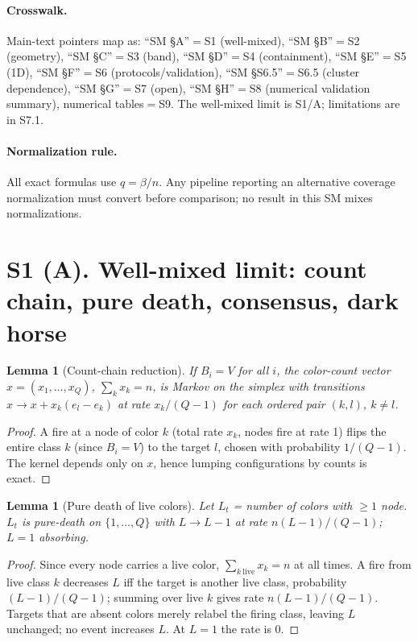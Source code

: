 \documentclass[preprint,12pt]{elsarticle}
\newtheorem{lemma}[theorem]{Lemma}
\begin{document}
\paragraph{Crosswalk.}
Main-text pointers map as: ``SM \S A''$=$S1 (well-mixed),
``SM \S B''$=$S2 (geometry), ``SM \S C''$=$S3 (band), ``SM \S D''$=$S4
(containment), ``SM \S E''$=$S5 (1D), ``SM \S F''$=$S6
(protocols/validation), ``SM \S S6.5''$=$S6.5 (cluster dependence),
``SM \S G''$=$S7 (open), ``SM \S H''$=$S8 (numerical validation summary),
numerical tables$=$S9. The well-mixed limit is S1/A; limitations are in S7.1.

\paragraph{Normalization rule.}
All exact formulas use $q=\beta/n$. Any pipeline reporting an alternative
coverage normalization must convert before comparison; no result in this
SM mixes normalizations.

\section{S1 (A). Well-mixed limit: count chain, pure death, consensus, dark horse}
\label{sec:A}

\begin{lemma}[Count-chain reduction]
\label{lem:A1}
If $B_i=V$ for all $i$, the color-count vector $x=(x_1,\dots,x_Q)$,
$\sum_k x_k=n$, is Markov on the simplex with transitions
$x\to x+x_k(e_l-e_k)$ at rate $x_k/(Q-1)$ for each ordered pair
$(k,l)$, $k\neq l$.
\end{lemma}
\begin{proof}
A fire at a node of color $k$ (total rate $x_k$, nodes fire at rate 1)
flips the entire class $k$ (since $B_i=V$) to the target $l$, chosen with
probability $1/(Q-1)$. The kernel depends only on $x$, hence lumping
configurations by counts is exact.
\end{proof}

\begin{lemma}[Pure death of live colors]
\label{lem:A2}
Let $L_t$ = number of colors with $\ge1$ node. $L_t$ is pure-death on
$\{1,\dots,Q\}$ with $L\to L-1$ at rate $n(L-1)/(Q-1)$; $L=1$ absorbing.
\end{lemma}
\begin{proof}
Since every node carries a live color,
$\sum_{k\ \mathrm{live}}x_k=n$ at all times. A fire from live class $k$
decreases $L$ iff the target is another live class, probability
$(L-1)/(Q-1)$; summing over live $k$ gives rate $n(L-1)/(Q-1)$. Targets
that are absent colors merely relabel the firing class, leaving $L$
unchanged; no event increases $L$. At $L=1$ the rate is 0.
\end{proof}
\end{document}
